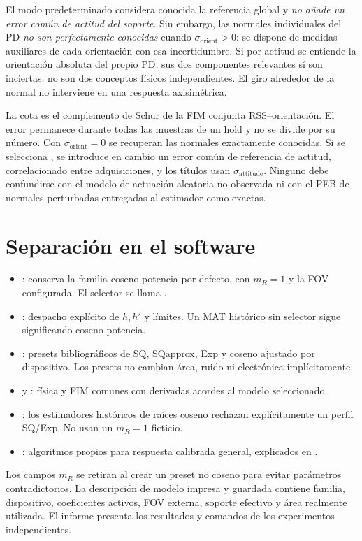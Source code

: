 \documentclass[11pt,a4paper]{article}
\begin{document}
El modo predeterminado  considera conocida la referencia global y \emph{no añade un error común de actitud del soporte}. Sin embargo, las normales individuales del PD \emph{no son perfectamente conocidas} cuando $\sigma_{\mathrm{orient}}>0$: se dispone de medidas auxiliares de cada orientación con esa incertidumbre. Si por actitud se entiende la orientación absoluta del propio PD, sus dos componentes relevantes sí son inciertas; no son dos conceptos físicos independientes. El giro alrededor de la normal no interviene en una respuesta axisimétrica.

La cota es el complemento de Schur de la FIM conjunta RSS--orientación. El error permanece durante todas las muestras de un hold y no se divide por su número. Con $\sigma_{\mathrm{orient}}=0$ se recuperan las normales exactamente conocidas. Si se selecciona , se introduce en cambio un error común de referencia de actitud, correlacionado entre adquisiciones, y los títulos usan $\sigma_{\mathrm{attitude}}$. Ninguno debe confundirse con el modelo de actuación aleatoria no observada ni con el PEB de normales perturbadas entregadas al estimador como exactas.

\section{Separación en el software}
\begin{itemize}
\item {}: conserva la familia coseno-potencia por defecto, con $m_R=1$ y la FOV configurada. El selector se llama .
\item {}: despacho explícito de $h,h'$ y límites. Un MAT histórico sin selector sigue significando coseno-potencia.
\item {}: presets bibliográficos de SQ, SQapprox, Exp y coseno ajustado por dispositivo. Los presets no cambian área, ruido ni electrónica implícitamente.
\item {} y : física y FIM comunes con derivadas acordes al modelo seleccionado.
\item {}: los estimadores históricos de raíces coseno rechazan explícitamente un perfil SQ/Exp. No usan un $m_R=1$ ficticio.
\item {}: algoritmos propios para respuesta calibrada general, explicados en .
\end{itemize}
Los campos $m_R$ se retiran al crear un preset no coseno para evitar parámetros contradictorios. La descripción de modelo impresa y guardada contiene familia, dispositivo, coeficientes activos, FOV externa, soporte efectivo y área realmente utilizada. El informe  presenta los resultados y comandos de los experimentos independientes.



\end{document}
